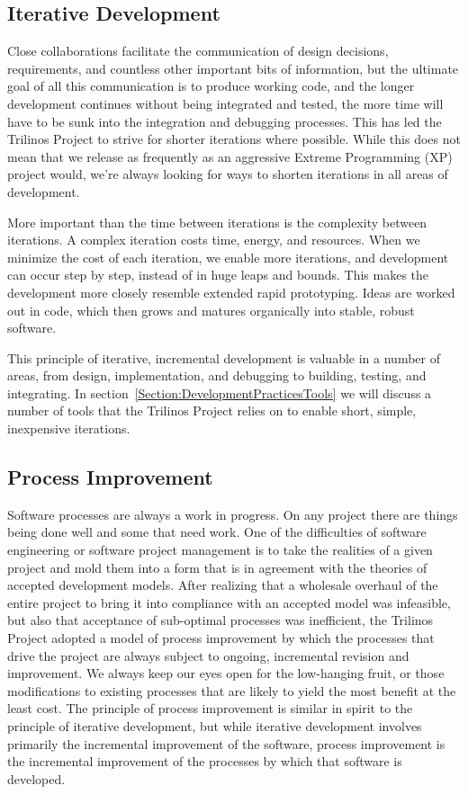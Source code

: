 \documentclass{doublecol}
\begin{document}
\subsection{Iterative Development}

Close collaborations facilitate the communication of design
decisions, requirements, and countless other important bits of
information, but the ultimate goal of all this communication is to
produce working code, and the longer development continues without
being integrated and tested, the more time will have to be sunk into
the integration and debugging processes.  This has led the Trilinos
Project to strive for shorter iterations where possible. While this
does not mean that we release as frequently as an aggressive Extreme
Programming (XP)~\cite{XP} project would, we're always looking for
ways to shorten iterations in all areas of development.

More important than the time between iterations is the complexity
between iterations.  A complex iteration costs time, energy, and
resources.  When we minimize the cost of each iteration, we enable
more iterations, and development can occur step by step, instead of
in huge leaps and bounds.  This makes the development more closely
resemble extended rapid prototyping.  Ideas are worked out in code,
which then grows and matures organically into stable, robust
software.

This principle of iterative, incremental development is valuable in
a number of areas, from design, implementation, and debugging to
building, testing, and integrating.  In
section~\ref{Section:DevelopmentPracticesTools} we will discuss a
number of tools that the Trilinos Project relies on to enable short,
simple, inexpensive iterations.

\subsection{Process Improvement}

Software processes are always a work in progress.  On any project
there are things being done well and some that need work.  One of
the difficulties of software engineering or software project
management is to take the realities of a given project and mold them
into a form that is in agreement with the theories of accepted
development models.  After realizing that a wholesale overhaul of
the entire project to bring it into compliance with an accepted
model was infeasible, but also that acceptance of sub-optimal
processes was inefficient, the Trilinos Project adopted a model of
process improvement by which the processes that drive the project
are always subject to ongoing, incremental revision and improvement.
We always keep our eyes open for the low-hanging fruit, or those
modifications to existing processes that are likely to yield the
most benefit at the least cost.  The principle of process
improvement is similar in spirit to the principle of iterative
development, but while iterative development involves primarily the
incremental improvement of the software, process improvement is the
incremental improvement of the processes by which that software is
developed.
\end{document}
